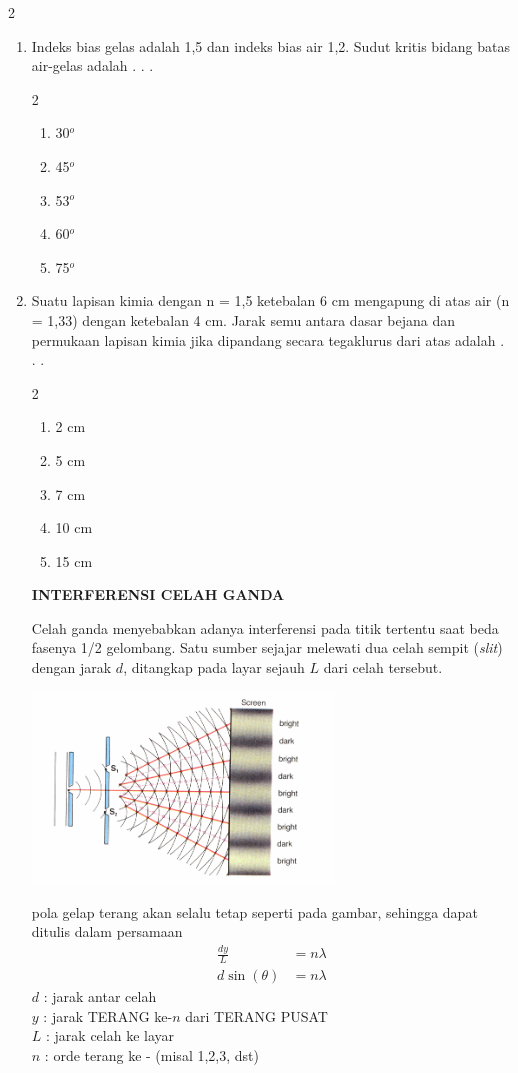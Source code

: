 \documentclass[11pt,a4paper]{extarticle}
\newcommand{\pilgani}[1]{                            \vspace{-0.3cm}\begin{multicols}{2}
 \begin{enumerate}[label=\Alph*., itemsep=0pt,topsep=0pt,leftmargin=*,align=Center]#1                     \end{enumerate}
 \phantom{ini cuma sapi, wedus, dan ayam}
 \end{multicols}}
\begin{document}
\begin{multicols*}{2}
\begin{enumerate}
\item Indeks bias gelas adalah 1,5 dan indeks bias air 1,2. Sudut kritis bidang batas air-gelas adalah . . .
\pilgani{
        \item 30$^o$
        \item 45$^o$
        \item 53$^o$
        \item 60$^o$
        \item 75$^o$
        }
\vspace{3cm}
\item Suatu lapisan kimia dengan n = 1,5 ketebalan 6 cm mengapung di atas air (n = 1,33) dengan ketebalan 4 cm. Jarak semu antara dasar bejana dan permukaan lapisan kimia jika dipandang secara tegaklurus dari atas adalah  . . . 
\pilgani{
        \item 2 cm
        \item 5 cm
        \item 7 cm
        \item 10 cm
        \item 15 cm
        }
\vspace{3cm}


\textbf{INTERFERENSI CELAH GANDA}

Celah ganda menyebabkan adanya interferensi pada titik tertentu saat beda fasenya 1/2 gelombang. Satu sumber sejajar melewati dua celah sempit (\textit{slit}) dengan jarak $d$, ditangkap pada layar sejauh $L$ dari celah tersebut.

\includegraphics[width=8cm]{pic/interganda}

pola gelap terang akan selalu tetap seperti pada gambar, sehingga dapat ditulis dalam persamaan
\begin{align*}
\frac{dy}{L} &= n \lambda\\
d \sin (\theta) &= n \lambda
\end{align*}
$d$ : jarak antar celah\\
$y$ : jarak TERANG ke-$n$ dari TERANG PUSAT\\
$L$ : jarak celah ke layar\\ 
$n$ : orde terang ke - (misal 1,2,3, dst)\\



\end{enumerate}
\end{multicols*}
\end{document}
